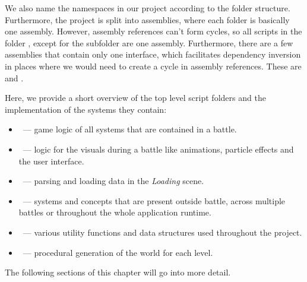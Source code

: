     We also name the namespaces in our project according to the folder structure.
    Furthermore, the project is split into assemblies, where each folder is basically one assembly.
    However, assembly references can't form cycles, so all scripts in the folder , except for the subfolder  are one assembly.
    Furthermore, there are a few assemblies that contain only one interface, which facilitates dependency inversion in places where we would need to create a cycle in assembly references.
    These are  and .

    Here, we provide a short overview of the top level script folders and the implementation of the systems they contain:
    \begin{itemize}
        \item {}~--- game logic of all systems that are contained in a battle.
        \item {}~--- logic for the visuals during a battle like animations, particle effects and the user interface.
        \item {}~--- parsing and loading data in the \emph{Loading} scene.
        \item {}~--- systems and concepts that are present outside battle, across multiple battles or throughout the whole application runtime.
        \item {}~--- various utility functions and data structures used throughout the project.
        \item {}~--- procedural generation of the world for each level.
    \end{itemize}
    The following sections of this chapter will go into more detail.

\fi



